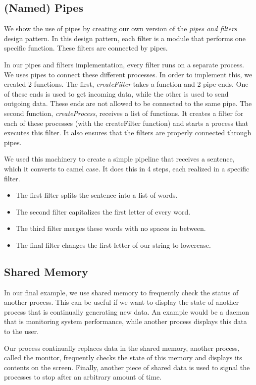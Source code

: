 
\newpage

\subsection{(Named) Pipes}
We show the use of pipes by creating our own version of the \textit{pipes and filters} design pattern. In this design pattern, each filter is a module that performs one specific function. These filters are connected by pipes.

In our pipes and filters implementation, every filter runs on a separate process. We uses pipes to connect these different processes.
In order to implement this, we created 2 functions. The first, \textit{createFilter} takes a function and 2 pipe-ends. One of these ends is used to get incoming data, while the other is used to send outgoing data. These ends are not allowed to be connected to the same pipe.
The second function, \textit{createProcess}, receives a list of functions. It creates a filter for each of these processes (with the createFilter function) and starts a process that executes this filter. It also ensures that the filters are properly connected through pipes.

We used this machinery to create a simple pipeline that receives a sentence, which it converts to camel case. It does this in 4 steps, each realized in a specific filter.

\begin{itemize}
	\item The first filter splits the sentence into a list of words.
	\item The second filter capitalizes the first letter of every word.
	\item The third filter merges these words with no spaces in between.
	\item The final filter changes the first letter of our string to lowercase.
\end{itemize}

\newpage

\newpage

\subsection{Shared Memory}

In our final example, we use shared memory to frequently check the status of another process. This can be useful if we want to display the state of another process that is continually generating new data. An example would be a daemon that is monitoring system performance, while another process displays this data to the user.

Our process continually replaces data in the shared memory, another process, called the monitor, frequently checks the state of this memory and displays its contents on the screen. Finally, another piece of shared data is used to signal the processes to stop after an arbitrary amount of time.



